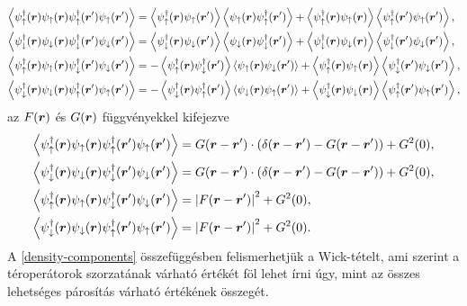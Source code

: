 \documentclass[a4paper,12pt,titlepage]{article}
\newcommand{\RR}{{\vb*{r}}}
\begin{document}
\begin{equation}
\begin{split} \label{density-components}
	\expval{\psi_\uparrow^\dagger(\RR) \psi_\uparrow(\RR) \psi_\uparrow^\dagger(\RR^\prime) \psi_\uparrow(\RR^\prime)} & = \expval{\psi_\uparrow^\dagger(\RR) \psi_\uparrow(\RR^\prime)} \expval{\psi_\uparrow(\RR) \psi_\uparrow^\dagger(\RR^\prime)} + \expval{\psi_\uparrow^\dagger(\RR) \psi_\uparrow(\RR)} \expval{\psi_\uparrow^\dagger(\RR^\prime) \psi_\uparrow(\RR^\prime)},  \\
	\expval{\psi_\downarrow^\dagger(\RR) \psi_\downarrow(\RR) \psi_\downarrow^\dagger(\RR^\prime) \psi_\downarrow(\RR^\prime)} & = \expval{\psi_\downarrow^\dagger(\RR) \psi_\downarrow(\RR^\prime)} \expval{\psi_\downarrow(\RR) \psi_\downarrow^\dagger(\RR^\prime)} + \expval{\psi_\downarrow^\dagger(\RR) \psi_\downarrow(\RR)} \expval{\psi_\downarrow^\dagger(\RR^\prime) \psi_\downarrow(\RR^\prime)},  \\
	\expval{\psi_\uparrow^\dagger(\RR) \psi_\uparrow(\RR) \psi_\downarrow^\dagger(\RR^\prime) \psi_\downarrow(\RR^\prime)} & = -\expval{\psi_\uparrow^\dagger(\RR) \psi_\downarrow^\dagger(\RR^\prime)} \expval{\psi_\uparrow(\RR) \psi_\downarrow(\RR^\prime)} + \expval{\psi_\uparrow^\dagger(\RR) \psi_\uparrow(\RR)} \expval{\psi_\downarrow^\dagger(\RR^\prime) \psi_\downarrow(\RR^\prime)},  \\
	\expval{\psi_\downarrow^\dagger(\RR) \psi_\downarrow(\RR) \psi_\uparrow^\dagger(\RR^\prime) \psi_\uparrow(\RR^\prime)} & = -\expval{\psi_\downarrow^\dagger(\RR) \psi_\uparrow^\dagger(\RR^\prime)} \expval{\psi_\downarrow(\RR) \psi_\uparrow(\RR^\prime)} + \expval{\psi_\downarrow^\dagger(\RR) \psi_\downarrow(\RR)} \expval{\psi_\uparrow^\dagger(\RR^\prime) \psi_\uparrow(\RR^\prime)},
\end{split}
\end{equation}
az $F(\RR)$ és $G(\RR)$ függvényekkel kifejezve
\begin{equation} \label{correlators-F-G}
\begin{split}
	\expval{\psi_\uparrow^\dagger(\RR) \psi_\uparrow(\RR) \psi_\uparrow^\dagger(\RR^\prime) \psi_\uparrow(\RR^\prime)} & = G(\RR - \RR^\prime) \cdot \left( \delta(\RR - \RR^\prime) - G(\RR - \RR^\prime) \right) + G^2(0), \\
	\expval{\psi_\downarrow^\dagger(\RR) \psi_\downarrow(\RR) \psi_\downarrow^\dagger(\RR^\prime) \psi_\downarrow(\RR^\prime)} & = G(\RR - \RR^\prime) \cdot \left( \delta(\RR - \RR^\prime) - G(\RR - \RR^\prime) \right) + G^2(0), \\
	\expval{\psi_\uparrow^\dagger(\RR) \psi_\uparrow(\RR) \psi_\downarrow^\dagger(\RR^\prime) \psi_\downarrow(\RR^\prime)} & = \left| F(\RR - \RR^\prime) \right|^2 + G^2(0), \\
	\expval{\psi_\downarrow^\dagger(\RR) \psi_\downarrow(\RR) \psi_\uparrow^\dagger(\RR^\prime) \psi_\uparrow(\RR^\prime)} & = \left| F(\RR - \RR^\prime) \right|^2 + G^2(0).
\end{split}
\end{equation}
A \eqref{density-components} összefüggésben felismerhetjük a Wick-tételt, ami szerint a téroperátorok szorzatának várható értékét föl lehet írni úgy, mint az összes lehetséges párosítás várható értékének összegét.
\end{document}
